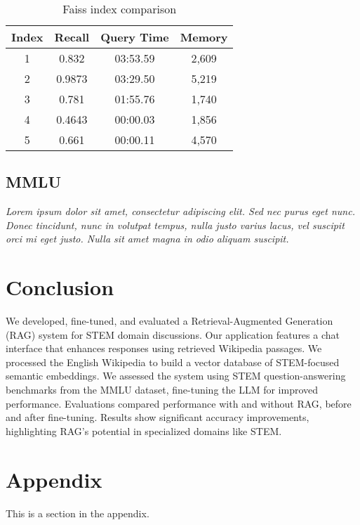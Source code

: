 \documentclass[11pt]{article}
\begin{document}
\begin{table}[h]
\centering
\begin{tabular}{|c|c|c|c|}
\hline
Index & Recall & Query Time & Memory \\
\hline
1 & 0.832 & 03:53.59 & 2,609 \\
2 & 0.9873 & 03:29.50 & 5,219 \\
3 & 0.781 & 01:55.76 & 1,740 \\
4 & 0.4643 & 00:00.03 & 1,856 \\
5 & 0.661 & 00:00.11 & 4,570 \\
\hline
\end{tabular}
\caption{Faiss index comparison}
\label{tab:faiss-index}
\end{table}

\subsection{MMLU}
\textit{Lorem ipsum dolor sit amet, consectetur adipiscing elit. Sed nec purus eget
nunc. Donec tincidunt, nunc in volutpat tempus, nulla justo varius lacus, vel
suscipit orci mi eget justo. Nulla sit amet magna in odio aliquam suscipit.}

\section{Conclusion}
We developed, fine-tuned, and evaluated a Retrieval-Augmented Generation (RAG) 
system for STEM domain discussions. Our application features a chat interface 
that enhances responses using retrieved Wikipedia passages. We processed the 
English Wikipedia to build a vector database of STEM-focused semantic 
embeddings. 
We assessed the system using STEM question-answering benchmarks from the MMLU 
dataset, fine-tuning the LLM for improved performance. Evaluations compared 
performance with and without RAG, before and after fine-tuning.
Results show significant accuracy improvements, highlighting RAG's potential 
in specialized domains like STEM.




\appendix

\section{Appendix}
\label{sec:appendix}

This is a section in the appendix.
\end{document}
